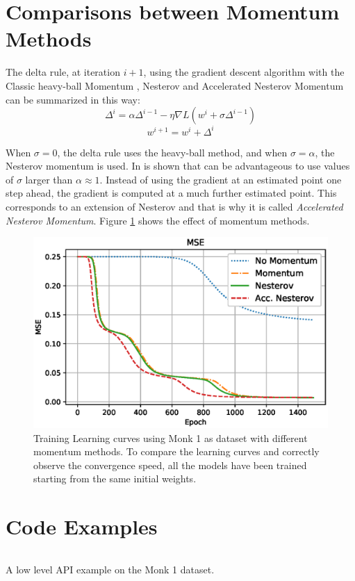 \newpage
\begin{appendices}
\section{Comparisons between Momentum Methods}
\label{appendix:momentum_comp}
The delta rule, at iteration $i+1$, using the gradient descent algorithm with the Classic  heavy-ball Momentum \cite{Polyak1964}, Nesterov \cite{sutskever2013} and Accelerated Nesterov Momentum \cite{nakerst2020gradient} can be summarized in this way:
$$ \Delta^i = \alpha\Delta^{i-1} - \eta\nabla L(w^i +\sigma\Delta^{i-1})$$
$$ w^{i+1} = w^i + \Delta^i$$

When $\sigma = 0$, the delta rule uses the heavy-ball method, and when $\sigma = \alpha$, the Nesterov momentum is used. In \cite{nakerst2020gradient} is shown that can be advantageous to use values of $\sigma$ larger than $\alpha \approx 1$. Instead of using the gradient at an estimated point one step ahead, the gradient is computed at a much further estimated point. This corresponds to an extension of Nesterov and that is why it is called \emph{Accelerated Nesterov Momentum}. Figure \ref{fig:monk1_4_momentum} shows the effect of momentum methods.
\begin{figure}[H]
    \centering
    \includegraphics[scale = 0.8]{Images/monk1_4_momentum.eps}
    \caption{Training Learning curves using Monk 1 as dataset with different momentum methods. To compare the learning curves and correctly observe the convergence speed, all the models have been trained starting from the same initial weights.}
    \label{fig:monk1_4_momentum}
\end{figure}
\newpage

\section{Code Examples}
\label{appendix:code_example}
\begin{listing}[!ht]
\inputminted{python}{code/low_api.py}
\caption{A low level API example on the Monk 1 dataset.}
\label{listing:low_api}
\end{listing}


\end{appendices}
